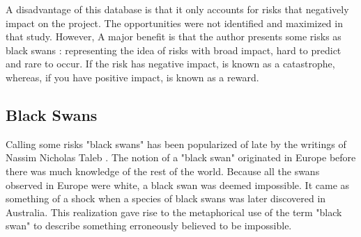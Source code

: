 A disadvantage of this database is that it only accounts for risks that negatively impact on the project. The opportunities were not identified and maximized in that study. However, A major benefit is that the author presents some risks as black swans \cite{KEND2003BOOK}: representing the idea of risks with broad impact, hard to predict and rare to occur. If the risk has negative impact, is known as a catastrophe, whereas, if you have positive impact, is known as a reward.

\subsection{Black Swans}

Calling some risks "black swans" has been popularized of late by the writings of Nassim Nicholas Taleb \cite{taleb2001fooled}. The notion of a "black swan" originated in Europe before there was much knowledge of the rest of the world. Because all the swans observed in Europe were white, a black swan was deemed impossible. It came as something of a shock when a species of black swans was later discovered in Australia. This realization gave rise to the metaphorical use of the term "black swan" to describe something erroneously believed to be impossible.

